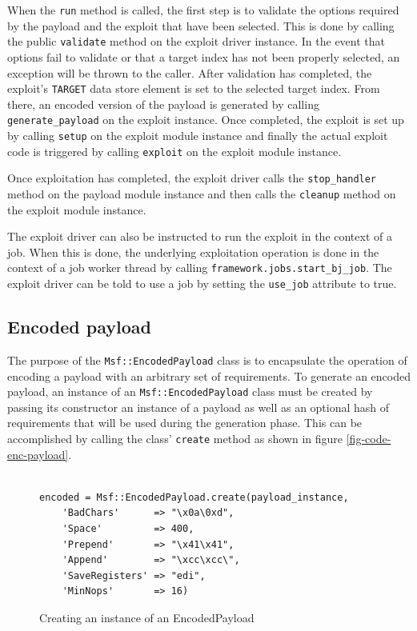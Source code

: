 \documentclass{report}
\begin{document}
\par
When the \texttt{run} method is called, the first step is to
validate the options required by the payload and the exploit that
have been selected.  This is done by calling the public
\texttt{validate} method on the exploit driver instance.  In the
event that options fail to validate or that a target index has not
been properly selected, an exception will be thrown to the caller.
After validation has completed, the exploit's \texttt{TARGET} data
store element is set to the selected target index.  From there, an
encoded version of the payload is generated by calling
\texttt{generate\_payload} on the exploit instance.  Once completed,
the exploit is set up by calling \texttt{setup} on the exploit
module instance and finally the actual exploit code is triggered by
calling \texttt{exploit} on the exploit module instance.

\par
Once exploitation has completed, the exploit driver calls the
\texttt{stop\_handler} method on the payload module instance and
then calls the \texttt{cleanup} method on the exploit module
instance.

\par
The exploit driver can also be instructed to run the exploit in the
context of a job.  When this is done, the underlying exploitation
operation is done in the context of a job worker thread by calling
\texttt{framework.jobs.start\_bj\_job}.  The exploit driver can be
told to use a job by setting the \texttt{use\_job} attribute to
true.

        \subsection{Encoded payload}

\par
The purpose of the \texttt{Msf::EncodedPayload} class is to
encapsulate the operation of encoding a payload with an arbitrary
set of requirements.  To generate an encoded payload, an instance of
an \texttt{Msf::EncodedPayload} class must be created by passing its
constructor an instance of a payload as well as an optional hash of
requirements that will be used during the generation phase.  This
can be accomplished by calling the class' \texttt{create} method as
shown in figure \ref{fig-code-enc-payload}.


\begin{figure}[h]
\begin{verbatim}

encoded = Msf::EncodedPayload.create(payload_instance,
    'BadChars'      => "\x0a\0xd",
    'Space'         => 400,
    'Prepend'       => "\x41\x41",
    'Append'        => "\xcc\xcc\",
    'SaveRegisters' => "edi",
    'MinNops'       => 16)
\end{verbatim}
\caption{Creating an instance of an EncodedPayload}
\label{fig-code-exploit-driver}
\end{figure}
\end{document}
